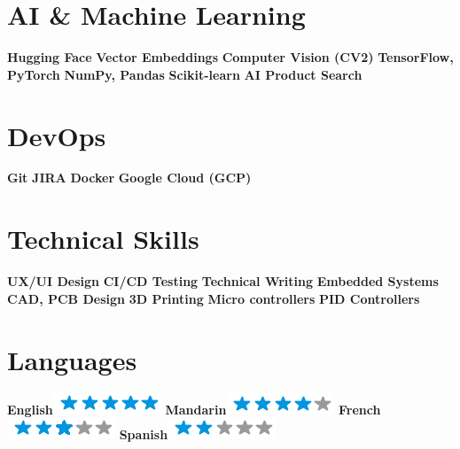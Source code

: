 \documentclass[]{cv}
\begin{document}
\begin{aside}
    \section{\small AI \& Machine Learning \vspace{0.05cm}}
    	\textbf{Hugging Face} 
        \textbf{Vector Embeddings}
    	\textbf{Computer Vision (CV2)}
    	\textbf{TensorFlow, PyTorch}
        \textbf{NumPy, Pandas}
    	\textbf{Scikit-learn}
    	\textbf{AI Product Search}
	\section{\small DevOps}
		\textbf{Git}
        \textbf{JIRA}
		\textbf{Docker}
        \textbf{Google Cloud (GCP)}
	\section{\small Technical Skills \vspace{0.05cm}}
    	\textbf{UX/UI Design}
    	\textbf{CI/CD Testing}
    	\textbf{Technical Writing}
    	\textbf{Embedded Systems}
    	\textbf{CAD, PCB Design}
    	\textbf{3D Printing}
    	\textbf{Micro controllers}
    	\textbf{PID Controllers}
	\section{\small Languages \vspace{0.05cm}}
    	\textbf{English}\includegraphics[scale=0.40]{img/5stars.png}
    	\textbf{Mandarin}\includegraphics[scale=0.40]{img/4stars.png}
    	\textbf{French}\includegraphics[scale=0.40]{img/3stars.png}
    	\textbf{Spanish}\includegraphics[scale=0.40]{img/2stars.png}
	~
	~
\end{aside}
\end{document}
